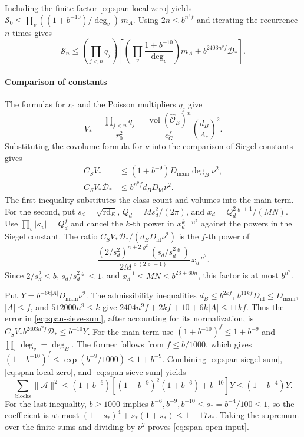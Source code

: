 Including the finite factor \eqref{eq:span-local-zero} yields
\(\mathcal S_0\le\prod_v((1+b^{-10})/\deg_v)\,m_A\).
Using \(2n\le b^{n^9f}\) and iterating the recurrence \(n\) times gives
\begin{equation}\label{eq:span-sieve-sum}
 \mathcal S_n\le \left(\prod_{j<n}q_j\right)
  \left[
    \left(\prod_v\frac{1+b^{-10}}{\deg_v}\right)m_A
    + b^{2403n^9f}\mathcal D_\ast
  \right].
\end{equation}

\paragraph{Comparison of constants}
The formulas for \(r_0\) and the Poisson multipliers
\(q_j\) give
\[
 V_\ast=\frac{\prod_{j<n}q_j}{r_0^2}
 =\frac{\operatorname{vol}(\widehat{\mathcal O}_E)^n}{c_G^f}
    \left(\frac{d_B}{\Lambda_\ast}\right)^2 .
\]
Substituting the covolume formula for \(\nu\) into the comparison of
Siegel constants gives
\[
 \begin{split}
 C_S V_\ast
  &\le(1+b^{-9})D_{\mathrm{main}}\deg_B\nu^2,\\
 C_S V_\ast\mathcal D_\ast
  &\le b^{n^9f}d_BD_{\mathrm{id}}\nu^2 .
 \end{split}
\]
The first inequality substitutes the class count and volumes into the
main term. For the second, put \(s_d=\sqrt{\operatorname{rd}_E}\),
\(Q_d=Ms_d^2/(2\pi)\), and \(x_d=Q_d^{2\varrho+1}/(MN)\).
Use \(\prod_v|\kappa_v|=Q_d^f\) and cancel the \(k\)-th power in
\(x_d^{k-n^7}\) against the powers in the Siegel constant. The ratio
\(C_SV_\ast\mathcal D_\ast/(d_BD_{\mathrm{id}}\nu^2)\) is the \(f\)-th
power of
\[
 \frac{(2/s_d^2)^{n+2\varrho^2}(s_d/s_d^{2\varrho})}
      {2M^{\varrho(2\varrho+1)}}\,x_d^{-n^7}.
\]
Since \(2/s_d^2\le b\), \(s_d/s_d^{2\varrho}\le1\), and
\(x_d^{-1}\le MN\le b^{23+60n}\), this factor is at most \(b^{n^9}\).

Put \(Y=b^{-6k|A|}D_{\mathrm{main}}\nu^2\). The admissibility inequalities
\(d_B\le b^{2kf}\), \(b^{11kf}D_{\mathrm{id}}\le D_{\mathrm{main}}\),
\(|A|\le f\), and \(512000n^9\le k\) give
\(2404n^9f+2kf+10+6k|A|\le11kf\). Thus the error in
\eqref{eq:span-sieve-sum}, after accounting for its normalization, is
\(C_SV_\ast b^{2403n^9f}\mathcal D_\ast\le b^{-10}Y\).
For the main term use \((1+b^{-10})^f\le1+b^{-9}\) and
\(\prod_v\deg_v=\deg_B\). The former follows from \(f\le b/1000\), which
gives \((1+b^{-10})^f\le\exp(b^{-9}/1000)\le1+b^{-9}\). Combining \eqref{eq:span-siegel-sum},
\eqref{eq:span-local-zero}, and \eqref{eq:span-sieve-sum} yields
\[
 \sum_{\mathrm{blocks}}\|\mathcal A\|^2
 \le (1+b^{-6})\left[(1+b^{-9})^2(1+b^{-6})+b^{-10}\right]Y
 \le (1+b^{-4})Y .
\]
For the last inequality, \(b\ge1000\) implies
\(b^{-6},b^{-9},b^{-10}\le s_\ast=b^{-4}/100\le1\), so the coefficient
is at most \((1+s_\ast)^4+s_\ast(1+s_\ast)\le1+17s_\ast\).
Taking the supremum over the finite sums and dividing by \(\nu^2\)
proves \eqref{eq:span-open-input}.

